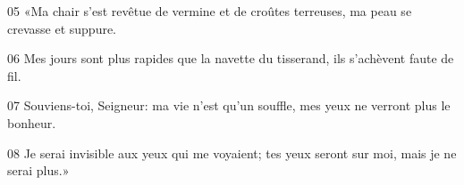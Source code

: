 
05 «Ma chair s’est revêtue de vermine et de croûtes terreuses, ma peau se crevasse et suppure.

06 Mes jours sont plus rapides que la navette du tisserand, ils s’achèvent faute de fil.

07 Souviens-toi, Seigneur: ma vie n’est qu’un souffle, mes yeux ne verront plus le bonheur.

08 Je serai invisible aux yeux qui me voyaient; tes yeux seront sur moi, mais je ne serai plus.»
